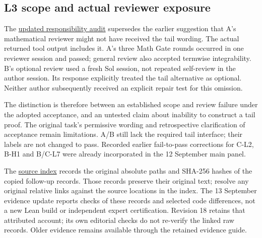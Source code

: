 \subsection[L3 scope and actual reviewer exposure]{\texorpdfstring{\protect\hypertarget{o3}{}L3 scope and actual reviewer exposure}{L3 scope and actual reviewer exposure}}
The \href{verification/revision13/l3/REVIEW_MECHANISM_RECHECK.zh-CN.md}{updated responsibility audit} supersedes the earlier suggestion that A's mathematical reviewer might not have received the tail wording. The actual returned tool output includes it. A's three Math Gate rounds occurred in one reviewer session and passed; general review also accepted termwise integrability. B's optional review used a fresh Sol session, not repeated self-review in the author session. Its response explicitly treated the tail alternative as optional. Neither author subsequently received an explicit repair test for this omission.

The distinction is therefore between an established scope and review failure under the adopted acceptance, and an untested claim about inability to construct a tail proof. The original task's permissive wording and retrospective clarification of acceptance remain limitations. A/B still lack the required tail interface; their labels are not changed to pass. Recorded earlier fail-to-pass corrections for C-L2, B-H1 and B/C-L7 were already incorporated in the 12 September main panel.

The \href{verification/revision13/SOURCE_INDEX.json}{source index} records the original absolute paths and SHA-256 hashes of the copied follow-up records. Those records preserve their original text; resolve any original relative links against the source locations in the index. The 13 September evidence update reports checks of these records and selected code differences, not a new Lean build or independent expert certification. Revision 18 retains that attributed account; its own editorial checks do not re-verify the linked raw records. Older evidence remains available through the retained evidence guide.

